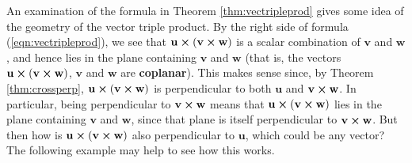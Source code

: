 An examination of the formula in Theorem \ref{thm:vectripleprod} gives some idea of the geometry of the vector triple
product. By the right side of formula (\ref{eqn:vectripleprod}), we see that
$\mathbf{u} \bm{\times} (\mathbf{v} \bm{\times} \mathbf{w})$ is a scalar combination of $\mathbf{v}$ and $\mathbf{w}$, and
hence lies in the plane containing $\mathbf{v}$ and $\mathbf{w}$ 
(that is, the vectors $\mathbf{u} \bm{\times} (\mathbf{v} \bm{\times} \mathbf{w})$, $\mathbf{v}$ and $\mathbf{w}$ are
\textbf{coplanar}).
This makes sense since, by Theorem \ref{thm:crossperp},
$\mathbf{u} \bm{\times} (\mathbf{v} \bm{\times} \mathbf{w})$ is perpendicular to both $\mathbf{u}$ and
$\mathbf{v} \bm{\times} \mathbf{w}$. In particular, being perpendicular to $\mathbf{v} \bm{\times} \mathbf{w}$ means
that $\mathbf{u} \bm{\times} (\mathbf{v} \bm{\times} \mathbf{w})$ lies in the plane containing $\mathbf{v}$ and
$\mathbf{w}$, since that plane is itself perpendicular to $\mathbf{v} \bm{\times} \mathbf{w}$. But then how is
$\mathbf{u} \bm{\times} (\mathbf{v} \bm{\times} \mathbf{w})$ also perpendicular to $\mathbf{u}$, which could be any
vector? The following example may help to see how this works.

